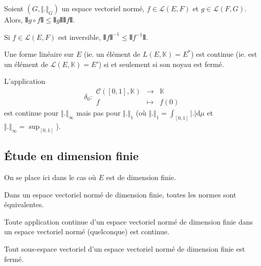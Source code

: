 	\begin{proposition}
		Soient $(G, \Vert . \Vert_G)$ un espace vectoriel normé, $f \in \mathcal{L}(E,F)$ et $g \in \mathcal{L}(F,G)$. Alors, $\VERT g \circ f \VERT \leq \VERT g \VERT \VERT f \VERT$.
	\end{proposition}

	\begin{proposition}
		Si $f \in \mathcal{L}(E,F)$ est inversible, $\VERT f \VERT^{-1} \leq \VERT f^{-1} \VERT$.
	\end{proposition}

	\begin{proposition}
		Une forme linéaire sur $E$ (ie. un élément de $L(E, \mathbb{K}) = E^*$) est continue (ie. est un élément de $\mathcal{L}(E, \mathbb{K}) = E'$) si et seulement si son noyau est fermé.
	\end{proposition}


	\begin{example}
		L'application
		\[
		\delta_0 : \begin{array}{ccc}
			\mathcal{C}([0,1], \mathbb{K}) &\rightarrow& \mathbb{K} \\
			f &\mapsto& f(0)
		\end{array}
		\]
		est continue pour $\Vert . \Vert_\infty$ mais pas pour $\Vert . \Vert_1$ (où $\Vert . \Vert_1 = \int_{[0,1]} \vert . \vert \mathrm{d}\mu$ et $\Vert . \Vert_\infty = \sup_{[0,1]}$).
	\end{example}

	\subsection{Étude en dimension finie}

	On se place ici dans le cas où $E$ est de dimension finie.

	\begin{theorem}
		Dans un espace vectoriel normé de dimension finie, toutes les normes sont équivalentes.
	\end{theorem}

	\begin{corollary}
		Toute application continue d'un espace vectoriel normé de dimension finie dans un espace vectoriel normé (quelconque) est continue.
	\end{corollary}

	\begin{corollary}
		Tout sous-espace vectoriel d'un espace vectoriel normé de dimension finie est fermé.
	\end{corollary}

